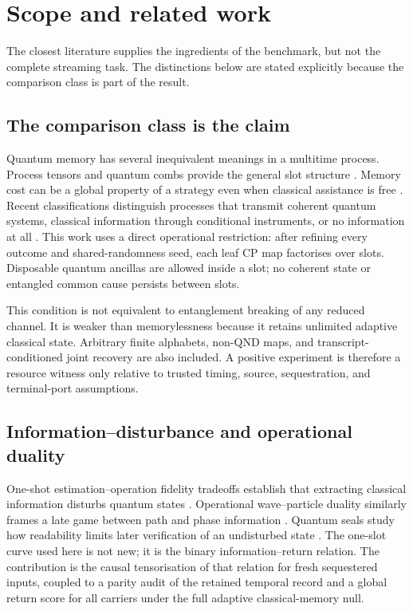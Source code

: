 \section{Scope and related work}

The closest literature supplies the ingredients of the benchmark, but not the complete streaming task. The distinctions below are stated explicitly because the comparison class is part of the result.

\subsection{The comparison class is the claim}

Quantum memory has several inequivalent meanings in a multitime process. Process tensors and quantum combs provide the general slot structure \cite{chiribella2009networks,pollock2018processes}. Memory cost can be a global property of a strategy even when classical assistance is free \cite{bisio2012memory}. Recent classifications distinguish processes that transmit coherent quantum systems, classical information through conditional instruments, or no information at all \cite{taranto2024hierarchy}. This work uses a direct operational restriction: after refining every outcome and shared-randomness seed, each leaf CP map factorises over slots. Disposable quantum ancillas are allowed inside a slot; no coherent state or entangled common cause persists between slots.

This condition is not equivalent to entanglement breaking of any reduced channel. It is weaker than memorylessness because it retains unlimited adaptive classical state. Arbitrary finite alphabets, non-QND maps, and transcript-conditioned joint recovery are also included. A positive experiment is therefore a resource witness only relative to trusted timing, source, sequestration, and terminal-port assumptions.

\subsection{Information--disturbance and operational duality}

One-shot estimation--operation fidelity tradeoffs establish that extracting classical information disturbs quantum states \cite{banaszek2001fidelity}. Operational wave--particle duality similarly frames a late game between path and phase information \cite{bagan2018duality}. Quantum seals study how readability limits later verification of an undisturbed state \cite{kimmel2019seals}. The one-slot curve used here is not new; it is the binary information--return relation. The contribution is the causal tensorisation of that relation for fresh sequestered inputs, coupled to a parity audit of the retained temporal record and a global return score for all carriers under the full adaptive classical-memory null.

